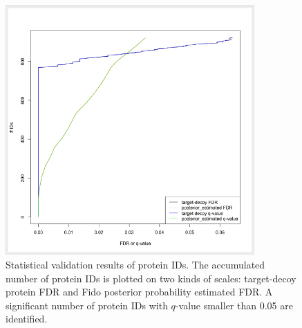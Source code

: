 \begin{figure}[htbp]
  \centering
  \includegraphics[width=0.85\textwidth]{graphics/protein_inference/proteinFDR.png}
  \caption{Statistical validation results of protein IDs. The accumulated number of protein IDs is plotted on two kinds of scales: target-decoy protein FDR and Fido posterior probability estimated FDR. A significant number of protein IDs with $q$-value smaller than 0.05 are identified.}
  \label{fig:proteinfdr}
\end{figure}

